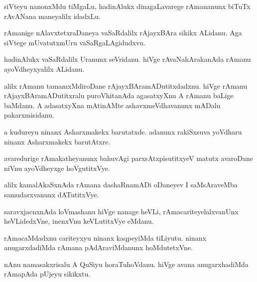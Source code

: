 \documentclass{article}
\begin{document}
\begin{mn}%
siVteyu nanonxMdu tiMgaLu, hadinAlukx dinagaLavarege rAmananunx biTuTx rAvANana maneyalilx 
idadxLu.
\end{mn}

\begin{mn}%
rAmanige nAlavxtetxraDaneya vaSaRdalilx rAjayxBAra sikikx ALidanu. Aga siVtege 
mUvatutxmUru vaSaRgaLAgidudxvu.
\end{mn}

\begin{mn}%
hadinAlukx vaSaRdalilx Uranunx seVridanu. hiVge rAvaNahArakanAda rAmanu ayoVdheyxyalilx 
ALidanu.
\end{mn}

\begin{mn}%
alilx rAmanu tamamxMdiroDane rAjayxBAramADutitxdadxnu. hiVge rAmanu rAjayxBAramADutitxralu 
puroVhitanAda agasatxyXnu A rAmanu baLige baMdanu. A adasatxyXna mAtinAMte 
ashavxmeVdhavanunx mADalu pakarxmisidanu.
\end{mn}

\begin{mn}%
a kudureyu ninanx Asharxmakekx barutatxde. adanunx rakiSxsuva yoVdharu ninanx Asharxmakekx 
barutAtxre.
\end{mn}

\begin{mn}%
avaredurige rAmakatheyanunx bahuvAgi parxsAtxpisutitxyeV matutx avaroDane niVnu 
ayoVdheyxge hoVgutitxVye. 
\end{mn}

\begin{mn}%
alilx kamalAkaSxnAda rAmana dashaRnamADi oDaneyev I saMsAraveMba samudarxvanunx dATutitxVye.
\end{mn}

\begin{mn}%
saravxjacnxnAda loVmashanu hiVge nanage heVLi, rAmacariteyelalxvanUnx heVLidedxVne, 
inenxVnu keVLutitxVye eMdanu.
\end{mn}

\begin{mn}%
rAmacaMdadxnu cariteyxyu  ninanx kaqpeyiMda tiLiyutu. ninanx anugarxdadiMda rAmana 
pAdAraviMdanunx hoMdutetxVne.
\end{mn}

\begin{mn}%
nAnu namasakxrisalu A QuSiyu horaTuhoVdanu. hiVge avana anugarxhadiMda rAmapAda pUjeyu 
sikikxtu.
\end{mn}
\end{document}
